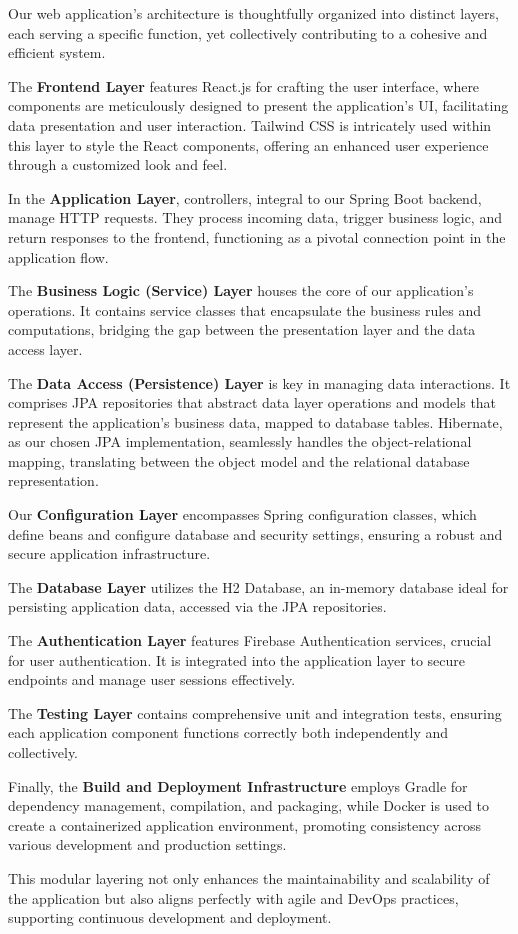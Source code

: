 Our web application's architecture is thoughtfully organized into distinct layers, each serving a specific function, yet collectively contributing to a cohesive and efficient system.

The \textbf{Frontend Layer} features React.js for crafting the user interface, where components are meticulously designed to present the application's UI, facilitating data presentation and user interaction. Tailwind CSS is intricately used within this layer to style the React components, offering an enhanced user experience through a customized look and feel.

In the \textbf{Application Layer}, controllers, integral to our Spring Boot backend, manage HTTP requests. They process incoming data, trigger business logic, and return responses to the frontend, functioning as a pivotal connection point in the application flow.

The \textbf{Business Logic (Service) Layer} houses the core of our application's operations. It contains service classes that encapsulate the business rules and computations, bridging the gap between the presentation layer and the data access layer.

The \textbf{Data Access (Persistence) Layer} is key in managing data interactions. It comprises JPA repositories that abstract data layer operations and models that represent the application's business data, mapped to database tables. Hibernate, as our chosen JPA implementation, seamlessly handles the object-relational mapping, translating between the object model and the relational database representation.

Our \textbf{Configuration Layer} encompasses Spring configuration classes, which define beans and configure database and security settings, ensuring a robust and secure application infrastructure.

The \textbf{Database Layer} utilizes the H2 Database, an in-memory database ideal for persisting application data, accessed via the JPA repositories.

The \textbf{Authentication Layer} features Firebase Authentication services, crucial for user authentication. It is integrated into the application layer to secure endpoints and manage user sessions effectively.

The \textbf{Testing Layer} contains comprehensive unit and integration tests, ensuring each application component functions correctly both independently and collectively.

Finally, the \textbf{Build and Deployment Infrastructure} employs Gradle for dependency management, compilation, and packaging, while Docker is used to create a containerized application environment, promoting consistency across various development and production settings.

This modular layering not only enhances the maintainability and scalability of the application but also aligns perfectly with agile and DevOps practices, supporting continuous development and deployment.
